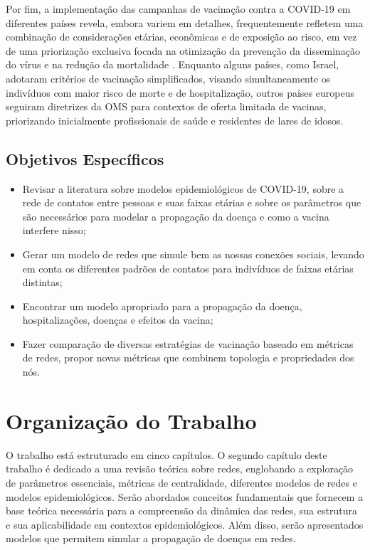 Por fim, a implementação das campanhas de vacinação contra a COVID-19 em diferentes países revela, embora variem em detalhes, frequentemente refletem uma combinação de considerações etárias, econômicas e de exposição ao risco, em vez de uma priorização exclusiva focada na otimização da prevenção da disseminação do vírus e na redução da mortalidade \cite{Huh2021,Rosen2021,Cadeddu2022,Jung2021}. Enquanto alguns países, como Israel, adotaram critérios de vacinação simplificados, visando simultaneamente os indivíduos com maior risco de morte e de hospitalização, outros países europeus seguiram diretrizes da OMS para contextos de oferta limitada de vacinas, priorizando inicialmente profissionais de saúde e residentes de lares de idosos. 


\subsection{Objetivos Específicos}
\begin{itemize}
    \item Revisar a literatura sobre modelos epidemiológicos de COVID-19, sobre a rede de 
    contatos entre pessoas e suas faixas etárias e sobre os parâmetros que são necessários para modelar a propagação da doença e como a vacina interfere nisso;
    \item Gerar um modelo de redes que simule bem as nossas conexões sociais,
levando em conta os diferentes padrões de contatos para indivíduos de faixas etárias distintas;
    \item Encontrar um modelo apropriado para a propagação da doença, hospitalizações, doenças e efeitos da vacina;
    \item Fazer comparação de diversas estratégias de vacinação baseado em métricas de redes, propor novas métricas que combinem topologia e 
    propriedades dos nós.

\end{itemize}

\section{Organização do Trabalho}

O trabalho está estruturado em cinco capítulos. O segundo capítulo deste trabalho é dedicado a uma revisão teórica sobre redes, englobando a exploração de parâmetros essenciais, métricas de centralidade, diferentes modelos de redes e modelos epidemiológicos. Serão abordados conceitos fundamentais que fornecem a base teórica necessária para a compreensão da dinâmica das redes, sua estrutura e sua aplicabilidade em contextos epidemiológicos. Além disso, serão apresentados modelos que permitem simular a propagação de doenças em redes.

